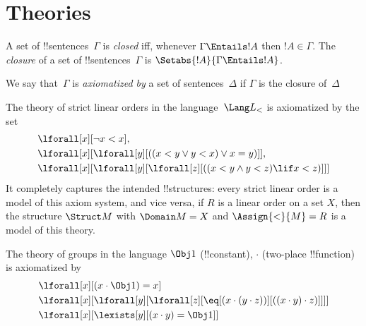 
\section{Theories}

\begin{defn}
A set of !!{sentence}s~$\Gamma$ is \emph{closed} iff, whenever
$\Gamma \Entails !A$ then $!A \in \Gamma$.  The \emph{closure} of a set
of !!{sentence}s~$\Gamma$ is $\Setabs{!A}{\Gamma \Entails !A}$.

We say that~$\Gamma$ is \emph{axiomatized by} a set of
sentences~$\Delta$ if $\Gamma$ is the closure of~$\Delta$
\end{defn}

\begin{ex}
The theory of strict linear orders in the language~$\Lang L_<$ is
axiomatized by the set
\begin{align*}
& \lforall[x][\lnot x < x], \\
& \lforall[x][\lforall[y][((x < y \lor y <
    x) \lor x = y)]], \\
& \lforall[x][\lforall[y][\lforall[z][((x < y
      \land y < z) \lif x < z)]]]
\end{align*}
It completely captures the intended !!{structure}s: every strict
linear order is a model of this axiom system, and vice versa, if $R$
is a linear order on a set $X$, then the structure $\Struct M$ with
$\Domain M = X$ and $\Assign{<}{M} = R$ is a model of this theory.
\end{ex}

\begin{ex}
The theory of groups in the language $\Obj 1$ (!!{constant}), $\cdot$
(two-place !!{function}) is axiomatized by
\begin{align*}
& \lforall[x][(x \cdot \Obj 1) = x]\\
& \lforall[x][\lforall[y][\lforall[z][\eq[(x \cdot (y \cdot z))][((x
          \cdot y) \cdot z)]]]]\\
& \lforall[x][\lexists[y][(x \cdot y) = \Obj 1]]
\end{align*}
\end{ex}

